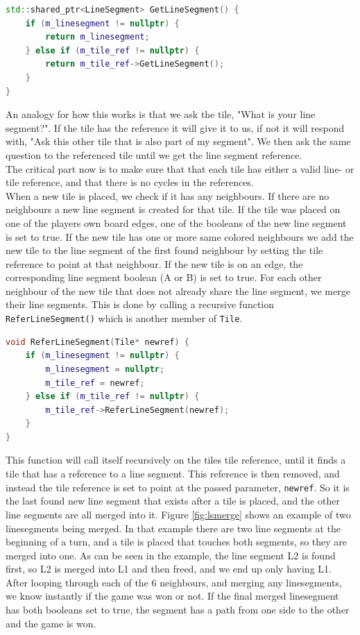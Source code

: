 \documentclass[a4paper]{article}
\begin{document}
\begin{lstlisting}[language=C++]
std::shared_ptr<LineSegment> GetLineSegment() {
    if (m_linesegment != nullptr) {
        return m_linesegment;
    } else if (m_tile_ref != nullptr) {
        return m_tile_ref->GetLineSegment();
    }
}
\end{lstlisting}
An analogy for how this works is that we ask the tile, "What is your line segment?". If the tile has the reference it will give it to us, if not it will respond with, "Ask this other tile that is also part of my segment". We then ask the same question to the referenced tile until we get the line segment reference.\\ 
The critical part now is to make sure that that each tile has either a valid line- or tile reference, and that there is no cycles in the references.\\
When a new tile is placed, we check if it has any neighbours. If there are no neighbours a new line segment is created for that tile. If the tile was placed on one of the players own board edges, one of the booleans of the new line segment is set to true. If the new tile has one or more same colored neighbours we add the new tile to the line segment of the first found neighbour by setting the tile reference to point at that neighbour. If the new tile is on an edge, the corresponding line segment boolean (A or B) is set to true. For each other neighbour of the new tile that does not already share the line segment, we merge their line segments. This is done by calling a recursive function \texttt{ReferLineSegment()} which is another member of \texttt {Tile}. 
\begin{lstlisting}[language=C++]
void ReferLineSegment(Tile* newref) {
    if (m_linesegment != nullptr) {
        m_linesegment = nullptr;
        m_tile_ref = newref;
    } else if (m_tile_ref != nullptr) {
        m_tile_ref->ReferLineSegment(newref);
    }
}
\end{lstlisting}
This function will call itself recursively on the tiles tile reference, until it finds a tile that has a reference to a line segment. This reference is then removed, and instead the tile reference is set to point at the passed parameter, \texttt{newref}. So it is the last found new line segment that exists after a tile is placed, and the other line segments are all merged into it.  Figure \ref{fig:lsmerge} shows an example of two linesegments being merged. In that example there are two line segments at the beginning of a turn, and a tile is placed that touches both segments, so they are merged into one. As can be seen in the example, the line segment L2 is found first, so L2 is merged into L1 and then freed, and we end up only having L1.\\
After looping through each of the 6 neighbours, and merging any linesegments, we know instantly if the game was won or not. If the final merged linesegment has both booleans set to true, the segment has a path from one side to the other and the game is won.
\end{document}
